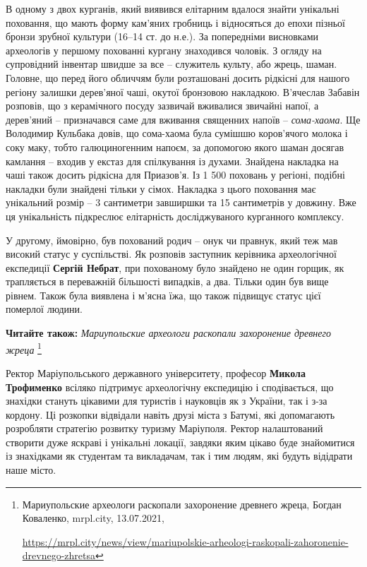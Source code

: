 
В одному з двох курганів, який виявився елітарним вдалося знайти унікальні
поховання, що мають форму кам'яних гробниць і відносяться до епохи пізньої
бронзи зрубної культури (16–14 ст. до н.е.). За попередніми висновками
археологів у першому похованні кургану знаходився чоловік. З огляду на
супровідний інвентар швидше за все – служитель культу, або жрець, шаман.
Головне, що перед його обличчям були розташовані досить  рідкісні для нашого
регіону залишки дерев'яної чаші, окутої бронзовою накладкою. В'ячеслав Забавін
розповів, що з керамічного посуду зазвичай вживалися звичайні напої, а
дерев'яний – призначався саме для вживання священних напоїв – \emph{сома-хаома}. Ще
Володимир Кульбака довів, що сома-хаома була сумішшю коров'ячого молока і соку
маку, тобто галюциногенним напоєм, за допомогою якого шаман досягав камлання –
входив у екстаз для спілкування із духами. Знайдена накладка на чаші також
досить рідкісна для Приазов'я. Із 1 500 поховань у регіоні, подібні накладки
були знайдені тільки у сімох. Накладка з цього поховання має унікальний розмір
– 3 сантиметри завширшки та 15 сантиметрів у довжину. Вже ця унікальність
підкреслює елітарність досліджуваного курганного комплексу.

У другому, ймовірно, був похований родич – онук чи правнук, який теж мав
високий статус у суспільстві. Як розповів заступник керівника археологічної
експедиції \textbf{Сергій Небрат}, при похованому було знайдено не один горщик, як
трапляється  в переважній більшості випадків, а два. Тільки один був вище
рівнем. Також була виявлена і м'ясна їжа, що також підвищує статус цієї
померлої людини.

\textbf{Читайте також:} \emph{Мариупольские археологи раскопали захоронение древнего жреца}%
\footnote{Мариупольские археологи раскопали захоронение древнего жреца, Богдан Коваленко, mrpl.city, 13.07.2021, \par%
\url{https://mrpl.city/news/view/mariupolskie-arheologi-raskopali-zahoronenie-drevnego-zhretsa}
}

Ректор Маріупольського державного університету, професор \textbf{Микола Трофименко}
всіляко підтримує археологічну експедицію і сподівається, що знахідки стануть
цікавими для туристів і науковців як з України, так і з-за кордону. Ці розкопки
відвідали навіть друзі міста  з Батумі, які допомагають розробляти стратегію
розвитку туризму Маріуполя. Ректор налаштований створити дуже яскраві і
унікальні локації, завдяки яким цікаво буде знайомитися із знахідками  як
студентам та викладачам, так  і тим людям, які будуть відідрати наше місто.


